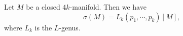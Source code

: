 \begin{theorem}[Hirzebruch]\label{thm:hirzebruch-signature-theorem}
	Let $M$ be a closed $4k$-manifold. Then we have
	\[
		\sigma(M) = L_k(p_1, \cdots, p_k)[M],
	\]
	where $L_k$ is the $L$-genus.
\end{theorem}
%
